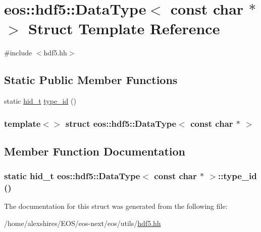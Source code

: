 \hypertarget{structeos_1_1hdf5_1_1DataType_3_01const_01char_01_5_01_4}{
\section{eos::hdf5::DataType$<$ const char $\ast$ $>$ Struct Template Reference}
\label{structeos_1_1hdf5_1_1DataType_3_01const_01char_01_5_01_4}
}


{\ttfamily \#include $<$hdf5.hh$>$}\subsection*{Static Public Member Functions}
\begin{DoxyCompactItemize}
\item 
static \hyperlink{namespaceeos_1_1hdf5_a5bd5e209f1bf36cdc5551465dacf2e74}{hid\_\-t} \hyperlink{structeos_1_1hdf5_1_1DataType_3_01const_01char_01_5_01_4_a917f76dfdee14b398ac9514608c24937}{type\_\-id} ()
\end{DoxyCompactItemize}
\subsubsection*{template$<$$>$ struct eos::hdf5::DataType$<$ const char $\ast$ $>$}



\subsection{Member Function Documentation}
\hypertarget{structeos_1_1hdf5_1_1DataType_3_01const_01char_01_5_01_4_a917f76dfdee14b398ac9514608c24937}{
\subsubsection[{type\_\-id}]{\setlength{\rightskip}{0pt plus 5cm}static {\bf hid\_\-t} {\bf eos::hdf5::DataType}$<$ const char $\ast$ $>$::type\_\-id ()}}
\label{structeos_1_1hdf5_1_1DataType_3_01const_01char_01_5_01_4_a917f76dfdee14b398ac9514608c24937}


The documentation for this struct was generated from the following file:\begin{DoxyCompactItemize}
\item 
/home/alexshires/EOS/eos-\/next/eos/utils/\hyperlink{hdf5_8hh}{hdf5.hh}\end{DoxyCompactItemize}
